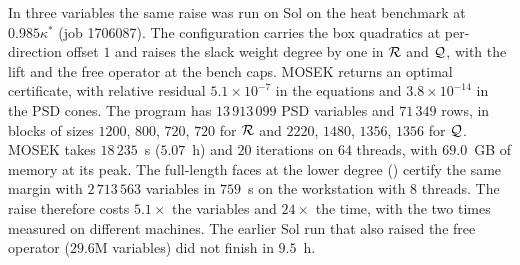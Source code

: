 In three variables the same raise was run on Sol on the heat benchmark at $0.985\kappa^*$ (job 1706087). The configuration carries the box quadratics at per-direction offset $1$ and raises the slack weight degree by one in $\mathcal{R}$ and $\mathcal{Q}$, with the lift and the free operator at the bench caps. MOSEK returns an optimal certificate, with relative residual $5.1\times10^{-7}$ in the equations and $3.8\times10^{-14}$ in the PSD cones. The program has $13\,913\,099$ PSD variables and $71\,349$ rows, in blocks of sizes $1200$, $800$, $720$, $720$ for $\mathcal{R}$ and $2220$, $1480$, $1356$, $1356$ for $\mathcal{Q}$. MOSEK takes $18\,235$~s ($5.07$~h) and $20$ iterations on $64$ threads, with $69.0$~GB of memory at its peak. The full-length faces at the lower degree () certify the same margin with $2\,713\,563$ variables in $759$~s on the workstation with $8$ threads. The raise therefore costs $5.1\times$ the variables and $24\times$ the time, with the two times measured on different machines. The earlier Sol run that also raised the free operator ($29.6$M variables) did not finish in $9.5$~h.
